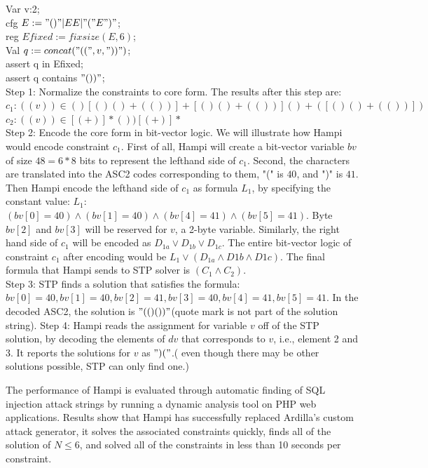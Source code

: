 \indent Var v:2;\\
\indent cfg $E := "()"|EE|"("E")"$;\\
\indent reg $Efixed := fixsize(E, 6)$;\\
\indent Val $q := concat("((",v,"))")$;\\
\indent assert q in Efixed;\\
\indent assert q contains $"())"$;\\

\noindent Step 1: Normalize the constraints to core form. The results after this step are:\\ 
$c_1: ((v))\in ()[()()+(())]+[()()+(())]()+([()()+(())])$\\
$c_2: ((v))\in [(+)]*())[(+)]*$\\
\noindent Step 2: Encode the core form in bit-vector logic. We will illustrate how Hampi would encode constraint $c_1$. First of all, Hampi will create a bit-vector variable $bv$ of size $48=6*8$ bits to represent the lefthand side of $c_1$. Second, the characters are translated into the ASC2 codes corresponding to them, "(" is $40$, and ")" is $41$. Then Hampi encode the lefthand side of $c_1$ as formula $L_1$, by specifying the constant value: $L_1$: $(bv[0]=40)\wedge (bv[1]=40)\wedge (bv[4]=41) \wedge (bv[5]=41)$. Byte $bv[2]$ and $bv[3]$ will be reserved for $v$, a 2-byte variable. Similarly, the right hand side of $c_1$ will be encoded as $D_{1a}\vee D_{1b}\vee D_{1c}$. The entire bit-vector logic of constraint $c_1$ after encoding would be $L_1\vee(D_{1a}\wedge D{1b}\wedge D{1c})$. The final formula that Hampi sends to STP solver is $(C_1\wedge C_2)$.\\
\noindent Step 3: STP finds a solution that satisfies the formula: $bv[0]=40, bv[1]=40, bv[2]=41, bv[3]=40, bv[4]=41, bv[5]=41$. In the decoded ASC2, the solution is $"(()())"$(quote mark is not part of the solution string).
\noindent Step 4: Hampi reads the assignment for variable $v$ off of the STP solution, by decoding the elements of $dv$ that corresponds to $v$, i.e., element 2 and 3. It reports the solutions for $v$ as $")("$.( even though there may be other solutions possible, STP can only find one.)

The performance of Hampi is evaluated through automatic finding of SQL injection attack strings by running a dynamic analysis tool on PHP web applications. Results show that Hampi has successfully replaced Ardilla\cite{}'s custom attack generator, it solves the associated constraints quickly, finds all of the solution of $N\leq 6$, and solved all of the constraints in less than 10 seconds per constraint. 